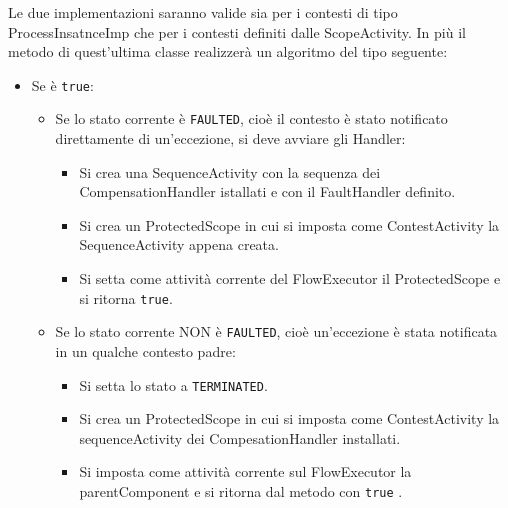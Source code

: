 Le due implementazioni saranno valide sia per i contesti di tipo
ProcessInsatnceImp che per i contesti definiti dalle ScopeActivity. In più il
metodo  di quest'ultima classe realizzerà un algoritmo del
tipo seguente:

\begin{itemize}
  \item Se  \`e \texttt{true}:
  	\begin{itemize}
    	\item Se lo stato corrente \`e \texttt{FAULTED}, cioè il contesto \`e
    	stato notificato direttamente di un'eccezione, si deve avviare gli Handler:
    		 \begin{itemize}
             	\item Si crea una SequenceActivity con la sequenza dei
             	CompensationHandler istallati e con il FaultHandler definito.
             	\item Si crea un ProtectedScope in cui si imposta come
             	ContestActivity la SequenceActivity appena creata.
             	\item Si setta come attività corrente del FlowExecutor il
             	ProtectedScope e si ritorna \texttt{true}.
             \end{itemize}    
    	\item Se lo stato corrente NON \`e \texttt{FAULTED}, cioè un'eccezione
    	\`e stata notificata in un qualche contesto padre:
    		 \begin{itemize}
             	\item Si setta lo stato a \texttt{TERMINATED}.
             	\item Si crea un ProtectedScope in cui si imposta come
             	ContestActivity la sequenceActivity dei CompesationHandler
             	installati. 
             	\item Si imposta come attività corrente sul FlowExecutor la
                parentComponent e si ritorna dal metodo con
                \texttt{true}
				.
             \end{itemize}
    \end{itemize}    
  

\end{itemize}
